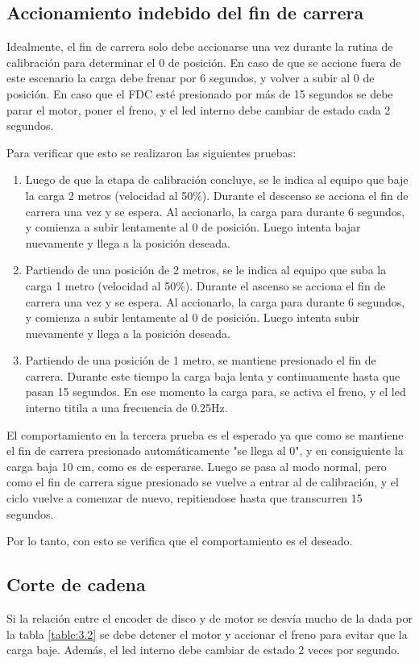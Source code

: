 \subsection{Accionamiento indebido del fin de carrera}
Idealmente, el fin de carrera solo debe accionarse una vez durante la rutina de calibración para determinar el 0 de posición. En caso de que se accione fuera de este escenario la carga debe frenar por 6 segundos, y volver a subir al 0 de posición. En caso que el FDC esté presionado por más de 15 segundos se debe parar el motor, poner el freno, y el led interno debe cambiar de estado cada 2 segundos.

Para verificar que esto se realizaron las siguientes pruebas:
\begin{enumerate}
	\item Luego de que la etapa de calibración concluye, se le indica al equipo que baje la carga 2 metros (velocidad al 50\%). Durante el descenso se acciona el fin de carrera una vez y se espera. Al accionarlo, la carga para durante 6 segundos, y comienza a subir lentamente al 0 de posición. Luego intenta bajar nuevamente y llega a la posición deseada.
	\item Partiendo de una posición de 2 metros, se le indica al equipo que suba la carga 1 metro (velocidad al 50\%). Durante el ascenso se acciona el fin de carrera una vez y se espera. Al accionarlo, la carga para durante 6 segundos, y comienza a subir lentamente al 0 de posición. Luego intenta subir nuevamente y llega a la posición deseada.
	\item Partiendo de una posición de 1 metro, se mantiene presionado el fin de carrera. Durante este tiempo la carga baja lenta y continuamente hasta que pasan 15 segundos. En ese momento la carga para, se activa el freno, y el led interno titila a una frecuencia de 0.25Hz.
\end{enumerate}

El comportamiento en la tercera prueba es el esperado ya que como se mantiene el fin de carrera presionado automáticamente "se llega al 0", y en consiguiente la carga baja 10 cm, como es de esperarse. Luego se pasa al modo normal, pero como el fin de carrera sigue presionado se vuelve a entrar al de calibración, y el ciclo vuelve a comenzar de nuevo, repitiendose hasta que transcurren 15 segundos.

Por lo tanto, con esto se verifica que el comportamiento es el deseado.
	
\newpage
\subsection{Corte de cadena}
Si la relación entre el encoder de disco y de motor se desvía mucho de la dada por la tabla \ref{table:3.2} se debe detener el motor y accionar el freno para evitar que la carga baje. Además, el led interno debe cambiar de estado 2 veces por segundo.

